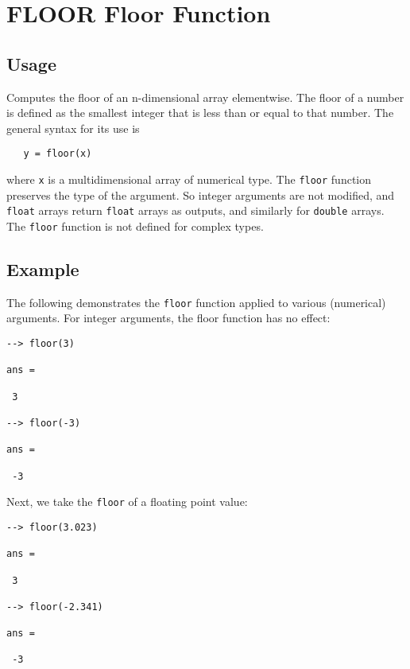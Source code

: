 \section{FLOOR Floor Function}

\subsection{Usage}

Computes the floor of an n-dimensional array elementwise.  The
floor of a number is defined as the smallest integer that is
less than or equal to that number. The general syntax for its use
is
\begin{verbatim}
   y = floor(x)
\end{verbatim}
where \verb|x| is a multidimensional array of numerical type.  The \verb|floor| 
function preserves the type of the argument.  So integer arguments 
are not modified, and \verb|float| arrays return \verb|float| arrays as 
outputs, and similarly for \verb|double| arrays.  The \verb|floor| function 
is not defined for complex types.
\subsection{Example}

The following demonstrates the \verb|floor| function applied to various
(numerical) arguments.  For integer arguments, the floor function has
no effect:
\begin{verbatim}
--> floor(3)

ans = 

 3 

--> floor(-3)

ans = 

 -3 
\end{verbatim}
Next, we take the \verb|floor| of a floating point value:
\begin{verbatim}
--> floor(3.023)

ans = 

 3 

--> floor(-2.341)

ans = 

 -3 
\end{verbatim}
